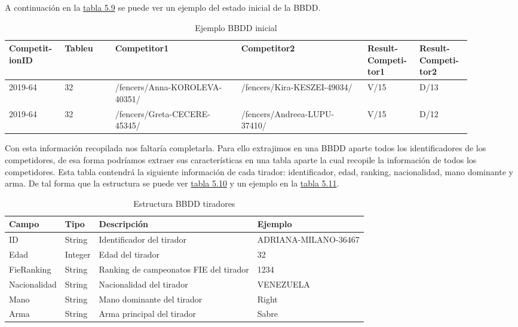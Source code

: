 A continuación en la \hyperref[tab:Ejemplo BBDD inicial iteracion5]{tabla 5.9} se puede ver un ejemplo del estado inicial de la BBDD.

\begin{longtable}[]{|p{0.1\linewidth} p{0.1\linewidth} p{0.25\linewidth} p{0.25\linewidth} p{0.1\linewidth} p{0.1\linewidth}|}
  \caption{Ejemplo BBDD inicial}
  \label{tab:Ejemplo BBDD inicial iteracion5}

  \endfirsthead
  \endhead

  \hline \rowcolor[HTML]{C0C0C0}
  Competit-ionID & Tableu & Competitor1 & Competitor2 & Result-Competi-tor1 & Result-Competi-tor2 \\ \hline
  2019-64 & 32 & /fencers/Anna-KOROLEVA-40351/ & /fencers/Kira-KESZEI-49034/ & V/15 & D/13 \\ \hline
  2019-64 & 32 & /fencers/Greta-CECERE-45345/ & /fencers/Andreea-LUPU-37410/ & V/15 & D/12 \\ \hline
\end{longtable}

Con esta información recopilada nos faltaría completarla. Para ello extrajimos en una BBDD
aparte todos los identificadores de los competidores, de esa forma podríamos extraer
sus características en una tabla aparte la cual recopile la información de todos
los competidores. Esta tabla contendrá la siguiente información de cada tirador:
identificador, edad, ranking, nacionalidad, mano dominante y arma. De tal forma
que la estructura se puede ver \hyperref[tab:Estructura BBDD tiradores]{tabla 5.10} y un ejemplo en la \hyperref[tab:Ejemplo BBDD tiradores]{tabla 5.11}.

\begin{table}[]
  \centering
  \caption{Estructura BBDD tiradores}
  \label{tab:Estructura BBDD tiradores}
  \begin{tabular}{|llll|}
    \hline \rowcolor[HTML]{C0C0C0}
    Campo & Tipo & Descripción & Ejemplo \\ \hline
    ID & String & Identificador del tirador & ADRIANA-MILANO-36467 \\ \hline
    Edad & Integer & Edad del tirador & 32 \\ \hline
    FieRanking & String & Ranking de campeonatos FIE del tirador & 1234 \\ \hline
    Nacionalidad & String & Nacionalidad del tirador & VENEZUELA \\ \hline
    Mano & String & Mano dominante del tirador & Right \\ \hline
    Arma & String & Arma principal del tirador & Sabre \\ \hline
  \end{tabular}
\end{table}


